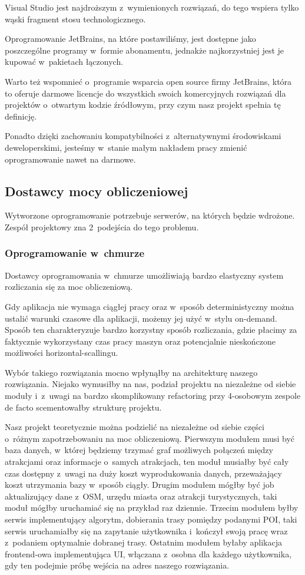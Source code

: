 Visual Studio jest najdroższym z~wymienionych rozwiązań, do tego wspiera tylko wąski fragment stosu technologicznego.

Oprogramowanie JetBrains, na które postawiliśmy, jest dostępne jako poszczególne programy w~formie abonamentu, jednakże najkorzystniej jest je kupować w~pakietach łączonych.

Warto też wspomnieć o~programie wsparcia open source firmy JetBrains, która to oferuje darmowe licencje do wszystkich swoich komercyjnych rozwiązań dla projektów o~otwartym kodzie źródłowym, przy czym nasz projekt spełnia tę definicję.

Ponadto dzięki zachowaniu kompatybilności z~alternatywnymi środowiskami deweloperskimi, jesteśmy w~stanie małym nakładem pracy zmienić oprogramowanie nawet na darmowe.

\subsection{Dostawcy mocy obliczeniowej}
\label{subsec:dostawcy-mocy-obliczeniowej}
Wytworzone oprogramowanie potrzebuje serwerów, na których będzie wdrożone.
Zespół projektowy zna 2~podejścia do tego problemu.

\subsubsection{Oprogramowanie w~chmurze}
Dostawcy oprogramowania w~chmurze umożliwiają bardzo elastyczny system rozliczania się za moc obliczeniową.

Gdy aplikacja nie wymaga ciągłej pracy oraz w~sposób deterministyczny można ustalić warunki czasowe dla aplikacji, możemy jej użyć w~stylu \gls{on-demand}.
Sposób ten charakteryzuje bardzo korzystny sposób rozliczania, gdzie płacimy za faktycznie wykorzystany czas pracy maszyn oraz potencjalnie nieskończone możliwości horizontal-scallingu.

Wybór takiego rozwiązania mocno wpłynąłby na architekturę naszego rozwiązania.
Niejako wymusiłby na nas, podział projektu na niezależne od siebie moduły i~z~uwagi na bardzo skomplikowany \gls{refactoring} przy 4-osobowym zespole de facto scementowałby strukturę projektu.

Nasz projekt teoretycznie można podzielić na niezależne od siebie części o~różnym zapotrzebowaniu na moc obliczeniową.
Pierwszym modułem musi być baza danych, w~której będziemy trzymać graf możliwych połączeń między atrakcjami oraz informacje o~samych atrakcjach, ten moduł musiałby być cały czas dostępny z~uwagi na duży koszt wyprodukowania danych, przeważający koszt utrzymania bazy w~sposób ciągły.
Drugim modułem mógłby być \gls{job} aktualizujący dane z~OSM, urzędu miasta oraz atrakcji turystycznych, taki moduł mógłby uruchamiać się na przykład raz dziennie.
Trzecim modułem byłby serwis implementujący algorytm, dobierania trasy pomiędzy podanymi POI, taki serwis uruchamiałby się na zapytanie użytkownika i~kończył swoją pracę wraz z~podaniem optymalnie dobranej trasy.
Ostatnim modułem byłaby aplikacja \gls{frontend}-owa implementująca UI, włączana z~osobna dla każdego użytkownika, gdy ten podejmie próbę wejścia na adres naszego rozwiązania.

